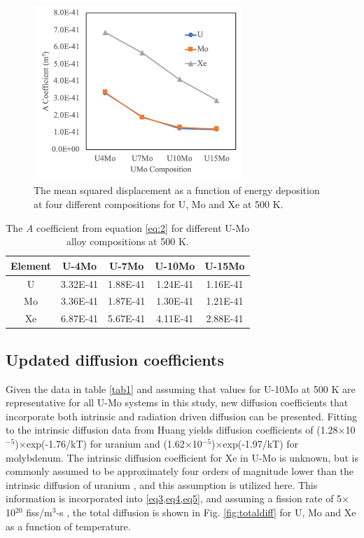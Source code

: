 \documentclass[review]{elsarticle}
\begin{document}
\begin{figure}[h]
 \centering
 \includegraphics[width=0.7\textwidth]{A_comp.png} 
 \caption{The mean squared displacement as a function of energy deposition at four different compositions for U, Mo and Xe at 500 K.}
 \label{fig:A_comp}
\end{figure}

\begin{table}[h!]
\caption{The \textit{A} coefficient from equation \ref{eq:2} for different U-Mo alloy compositions at 500 K. }
\label{tab1}
\begin{center}
\begin{tabular}{|c|c|c|c|c|}
     \hline
Element & U-4Mo & U-7Mo & U-10Mo & U-15Mo  \\
\hline
U & 3.32E-41 & 1.88E-41 &  1.24E-41 & 1.16E-41 \\
Mo & 3.36E-41 & 1.87E-41 & 1.30E-41 & 1.21E-41 \\
Xe & 6.87E-41 &  5.67E-41 & 4.11E-41 & 2.88E-41  \\
 \hline
\end{tabular}
\end{center}
\label{default}
\end{table}%


\subsection{Updated diffusion coefficients}

Given the data in table \ref{tab1} and assuming that values for U-10Mo at 500 K are representative for all U-Mo systems in this study, new diffusion coefficients that incorporate both intrinsic and radiation driven diffusion can be presented. Fitting to the intrinsic diffusion data from Huang \cite{huang2013} yields diffusion coefficients of (1.28$\times$10$^{-5}$)$\times$exp(-1.76/kT) for uranium and (1.62$\times$10$^{-5}$)$\times$exp(-1.97/kT) for molybdenum. The intrinsic diffusion coefficient for Xe in U-Mo is unknown, but is commonly assumed to be approximately four orders of magnitude lower than the intrinsic diffusion of uranium \cite{hu2016a, ushprr17, ushprr18}, and this assumption is utilized here. This information is incorporated into \cref{eq3,eq4,eq5}, and assuming a fission rate of 5$\times$10$^{20}$ fiss/m$^3$-s \cite{ushprr17, ushprr18}, the total diffusion is shown in Fig. \ref{fig:totaldiff} for U, Mo and Xe as a function of temperature. 
\end{document}
